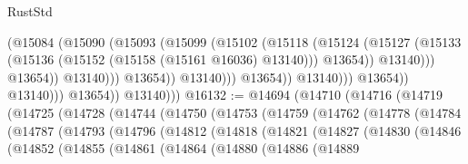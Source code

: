 \begin{lexlean}{RustStd}
\begin{coremodule}
                                              (@15084
                                                (@15090
                                                  (@15093
                                                    (@15099
                                                      (@15102
                                                        (@15118
                                                          (@15124
                                                            (@15127
                                                              (@15133
                                                                (@15136
                                                                  (@15152
                                                                    (@15158
                                                                      (@15161 @16036)
                                                                      @13140)))
                                                                @13654))
                                                            @13140)))
                                                      @13654))
                                                  @13140)))
                                            @13654))
                                        @13140)))
                                  @13654))
                              @13140)))
                        @13654))
                    @13140)))
              @13654))
          @13140)))
@16132 := @14694
    (@14710
      (@14716
        (@14719
          (@14725
            (@14728
              (@14744
                (@14750
                  (@14753
                    (@14759
                      (@14762
                        (@14778
                          (@14784
                            (@14787
                              (@14793
                                (@14796
                                  (@14812
                                    (@14818
                                      (@14821
                                        (@14827
                                          (@14830
                                            (@14846
                                              (@14852
                                                (@14855
                                                  (@14861
                                                    (@14864
                                                      (@14880
                                                        (@14886
                                                          (@14889

\end{coremodule}
\end{lexlean}
